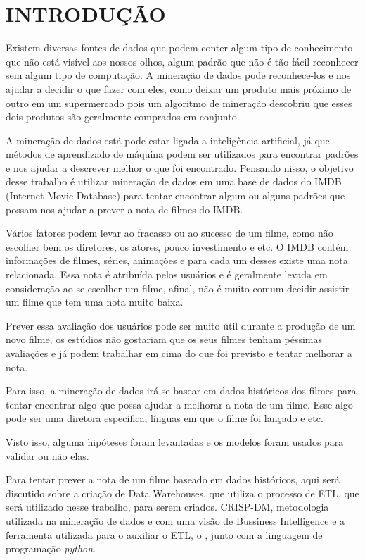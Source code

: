 \section{INTRODUÇÃO}

Existem diversas fontes de dados que podem conter algum tipo de conhecimento que não está visível aos nossos olhos, algum padrão que não é tão fácil reconhecer sem algum tipo de computação. A mineração de dados pode reconhece-los e nos ajudar a decidir o que fazer com eles, como deixar um produto mais próximo de outro em um supermercado pois um algoritmo de mineração descobriu que esses dois produtos são geralmente comprados em conjunto.

A mineração de dados está pode estar ligada a inteligência artificial, já que métodos de aprendizado de máquina podem ser utilizados para encontrar padrões e nos ajudar a descrever melhor o que foi encontrado.
Pensando nisso, o objetivo desse trabalho é utilizar mineração de dados em uma base de dados do IMDB (Internet Movie Database) para tentar encontrar algum ou alguns padrões que possam nos ajudar a prever a nota de filmes do IMDB.

Vários fatores podem levar ao fracasso ou ao sucesso de um filme, como não escolher bem os diretores, os atores, pouco investimento e etc. O IMDB contém informações de filmes, séries, animações e para cada um desses existe uma nota relacionada. Essa nota é atribuída pelos usuários e é geralmente levada em consideração ao se escolher um filme, afinal, não é muito comum decidir assistir um filme que tem uma nota muito baixa.

Prever essa avaliação dos usuários pode ser muito útil durante a produção de um novo filme, os estúdios não gostariam que os seus filmes tenham péssimas avaliações e já podem trabalhar em cima do que foi previsto e tentar melhorar a nota.

Para isso, a mineração de dados irá se basear em dados históricos dos filmes para tentar encontrar algo que possa ajudar a melhorar a nota de um filme. Esse algo pode ser uma diretora especifica, línguas em que o filme foi lançado e etc.

Visto isso, alguma hipóteses foram levantadas e os modelos foram usados para validar ou não elas.

Para tentar prever a nota de um filme baseado em dados históricos, aqui será discutido sobre a criação de Data Warehouses, que utiliza o processo de ETL, que será utilizado nesse trabalho, para serem criados. CRISP-DM, metodologia utilizada na mineração de dados e com uma visão de Bussiness Intelligence e a ferramenta utilizada para o auxiliar o ETL, o \pdi, junto com a linguagem de programação \textit{python}.

